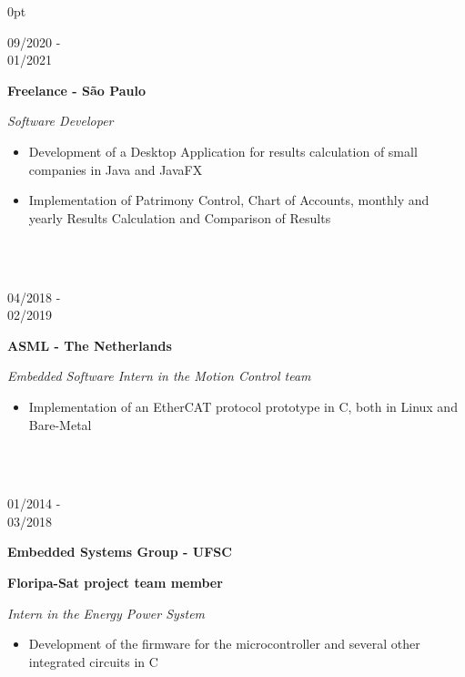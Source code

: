 \documentclass[a4paper]{article}
\begin{document}
\begin{adjustwidth}{\parindent}{0pt}
\begin{minipage}[t]{0.65\textwidth}
  \begin{minipage}[t]{0.2\textwidth}
    \large{09/2020 - \\ 01/2021}
    \end{minipage}
    \begin{minipage}[t]{0.8\textwidth}
    {
      \setlength{\parskip}{5.5pt}
      \Large{\textbf{Freelance - São Paulo}}
    
      \large{\textit{Software Developer}}
      \begin{itemize}
        \item \normalsize{Development of a Desktop Application for results calculation of small companies in Java and JavaFX}
        \item \normalsize{Implementation of Patrimony Control, Chart of Accounts, monthly and yearly Results Calculation and Comparison of Results}
      \end{itemize}
    }
    \end{minipage} \\ \\

	\begin{minipage}[t]{0.2\textwidth}
	\large{04/2018 - \\ 02/2019}
	\end{minipage}
	\begin{minipage}[t]{0.8\textwidth}
	{
	  \setlength{\parskip}{5.5pt}
	  \Large{\textbf{ASML - The Netherlands}}
	  
	  \large{\textit{Embedded Software Intern in the Motion Control team}}
	  \begin{itemize}
	    \item \normalsize{Implementation of an EtherCAT protocol prototype in C, both in Linux and Bare-Metal}
	  \end{itemize}
	}
\end{minipage} \\ \\

\begin{minipage}[t]{0.2\textwidth}
  \large{01/2014 - \\ 03/2018}
\end{minipage}
\begin{minipage}[t]{0.8\textwidth}
{
  \setlength{\parskip}{5.5pt}
  \Large{\textbf{Embedded Systems Group - UFSC}}
  
  \large{\textbf{Floripa-Sat project team member}}
  
  \large{\textit{Intern in the Energy Power System}}
}
\begin{itemize}
  \item \normalsize{Development of the firmware for the microcontroller and several other integrated circuits in C}
\end{itemize}
  

\end{minipage}
\end{minipage}
\end{adjustwidth}
\end{document}
